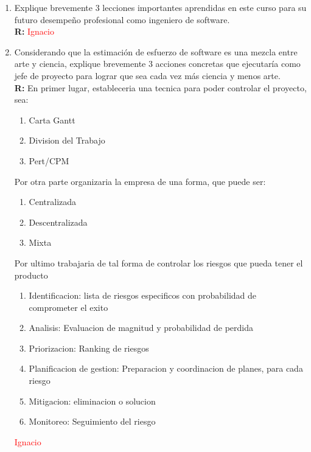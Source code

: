 \begin{enumerate}
	\item Explique brevemente 3 lecciones importantes aprendidas en este curso para su futuro desempeño profesional como ingeniero de software.\\
	\textbf{R:}
	\textcolor{red}{Ignacio}

	\item Considerando que la estimación de esfuerzo de software es una mezcla entre arte y ciencia, explique brevemente 3 acciones concretas que ejecutaría como jefe de proyecto para lograr que sea cada vez más ciencia y menos arte.\\
	\textbf{R:} En primer lugar, estableceria una tecnica para poder controlar el proyecto, sea:
                \begin{enumerate}
                        \item Carta Gantt
                        \item Division del Trabajo
                        \item Pert/CPM
                \end{enumerate}
		    Por otra parte organizaria la empresa de una forma, que puede ser:
                \begin{enumerate}
                        \item Centralizada
                        \item Descentralizada
                        \item Mixta
                \end{enumerate}
		    Por ultimo trabajaria de tal forma de controlar los riesgos que pueda tener el producto
                \begin{enumerate}
                        \item Identificacion: lista de riesgos especificos con probabilidad de comprometer el exito
                        \item Analisis: Evaluacion de magnitud y probabilidad de perdida
                        \item Priorizacion: Ranking de riesgos
			\item Planificacion de gestion: Preparacion y coordinacion de planes, para cada riesgo
			\item Mitigacion: eliminacion o solucion
			\item Monitoreo: Seguimiento del riesgo
                \end{enumerate}
	\textcolor{red}{Ignacio}


\end{enumerate}
